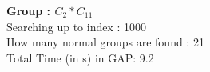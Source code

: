 \textbf{Group : $C_2*C_{11}$}\\
Searching up to index : 1000\\
How many normal groups are found : 21\\
Total Time (in s) in GAP: 9.2\\
